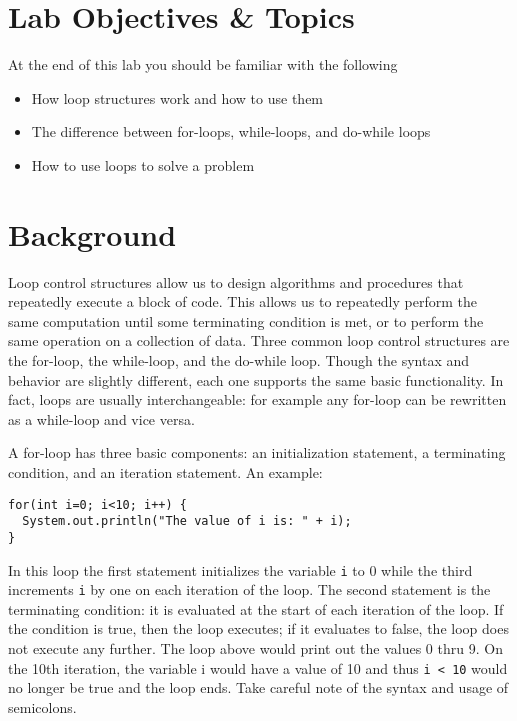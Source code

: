 \documentclass[12pt]{scrartcl}
\begin{document}
\section{Lab Objectives \& Topics}
At the end of this lab you should be familiar with the following
\begin{itemize}
  \item How loop structures work and how to use them
  \item The difference between for-loops, while-loops, and do-while loops
  \item How to use loops to solve a problem
\end{itemize}

\section{Background}

Loop control structures allow us to design algorithms and procedures 
that repeatedly execute a block of code.  This allows us to repeatedly 
perform the same computation until some terminating condition is met, 
or to perform the same operation on a collection of data.  Three 
common loop control structures are the for-loop, the while-loop, and 
the do-while loop.  Though the syntax and behavior are slightly different, 
each one supports the same basic functionality.  In fact, loops are 
usually interchangeable: for example any for-loop can be rewritten 
as a while-loop and vice versa.

A for-loop has three basic components: an initialization statement, 
a terminating condition, and an iteration statement.  An example:

\begin{verbatim}
for(int i=0; i<10; i++) {
  System.out.println("The value of i is: " + i);
}
\end{verbatim}

In this loop the first statement initializes the variable \texttt{i} 
to 0 while the third increments \texttt{i} by one on each 
iteration of the loop.  The second statement is the terminating 
condition: it is evaluated at the start of each iteration of the loop.  
If the condition is true, then the loop executes; if it evaluates to 
false, the loop does not execute any further.  The loop above 
would print out the values 0 thru 9.  On the 10th iteration, the 
variable i would have a value of 10 and thus \texttt{i < 10} 
would no longer be true and the loop ends.  Take careful note of the 
syntax and usage of semicolons.
\end{document}
